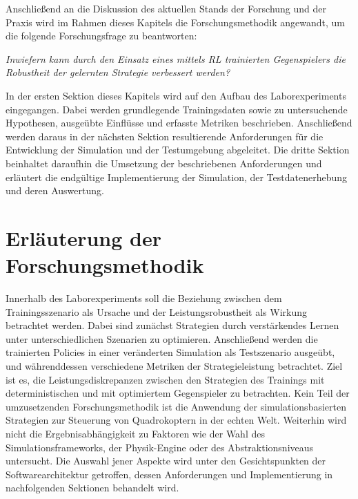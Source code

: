 Anschließend an die Diskussion des aktuellen Stands der Forschung und der Praxis wird im Rahmen dieses Kapitels die Forschungsmethodik angewandt, um die folgende Forschungsfrage zu beantworten:

\textit{Inwiefern kann durch den Einsatz eines mittels RL trainierten Gegenspielers die Robustheit der gelernten Strategie verbessert werden?}


In der ersten Sektion dieses Kapitels wird auf den Aufbau des Laborexperiments eingegangen.
Dabei werden grundlegende Trainingsdaten sowie zu untersuchende Hypothesen, ausgeübte Einflüsse und erfasste Metriken beschrieben.
Anschließend werden daraus in der nächsten Sektion resultierende Anforderungen für die Entwicklung der Simulation und der Testumgebung abgeleitet. 
Die dritte Sektion beinhaltet daraufhin die Umsetzung der beschriebenen Anforderungen und erläutert die endgültige Implementierung der Simulation, der Testdatenerhebung und deren Auswertung.

\section{Erläuterung der Forschungsmethodik}

Innerhalb des Laborexperiments soll die Beziehung zwischen dem Trainingsszenario als Ursache und der Leistungsrobustheit als Wirkung betrachtet werden.
Dabei sind zunächst Strategien durch verstärkendes Lernen unter unterschiedlichen Szenarien zu optimieren. 
Anschließend werden die trainierten Policies in einer veränderten Simulation als Testszenario ausgeübt, und währenddessen verschiedene Metriken der Strategieleistung betrachtet.
Ziel ist es, die Leistungsdiskrepanzen zwischen den Strategien des Trainings mit deterministischen und mit optimiertem Gegenspieler zu betrachten.
Kein Teil der umzusetzenden Forschungsmethodik ist die Anwendung der simulationsbasierten Strategien zur Steuerung von Quadrokoptern in der echten Welt. 
Weiterhin wird nicht die Ergebnisabhängigkeit zu Faktoren wie der Wahl des Simulationsframeworks, der Physik-Engine oder des Abstraktionsniveaus untersucht.
Die Auswahl jener Aspekte wird unter den Gesichtspunkten der Softwarearchitektur getroffen, dessen Anforderungen und Implementierung in nachfolgenden Sektionen behandelt wird.


